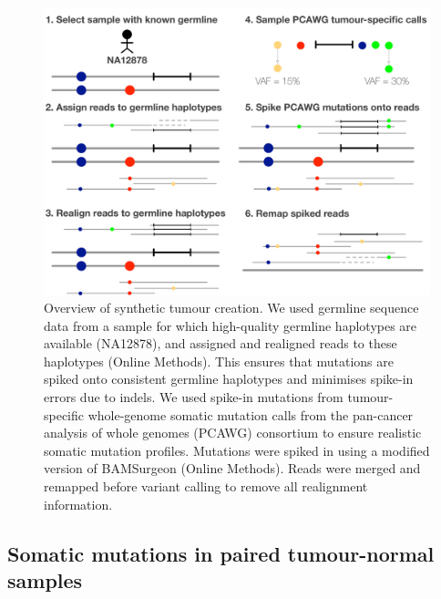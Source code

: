 \documentclass[notitlepage, twocolumn, 10pt]{article}
\begin{document}
\begin{figure}[tp]
    \includegraphics[width=\linewidth]{figures/syntumour}
    \caption{Overview of synthetic tumour creation. We used germline sequence data from a sample for which high-quality germline haplotypes are available (NA12878), and assigned and realigned reads to these haplotypes (Online Methods). This ensures that mutations are spiked onto consistent germline haplotypes and minimises spike-in errors due to indels. We used spike-in mutations from tumour-specific whole-genome somatic mutation calls from the pan-cancer analysis of whole genomes (PCAWG) consortium \cite{RN471} to ensure realistic somatic mutation profiles. Mutations were spiked in using a modified version of BAMSurgeon \cite{RN147} (Online Methods). Reads were merged and remapped before variant calling to remove all realignment information.}
    \label{fig:syntumour}
\end{figure}

\subsection*{Somatic mutations in paired tumour-normal samples}
\end{document}
